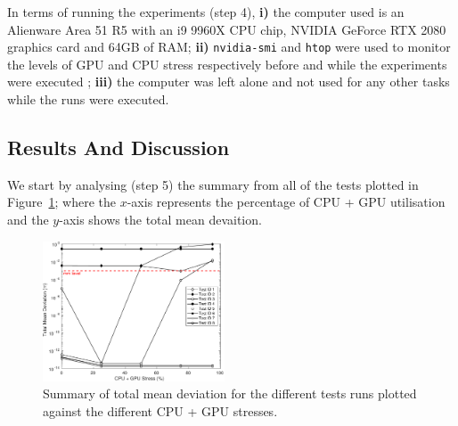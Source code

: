 In terms of running the experiments (step 4), \textbf{i)} the computer used is an Alienware Area 51 R5 with an i9 9960X CPU chip, NVIDIA GeForce RTX 2080 graphics card and 64GB of RAM; \textbf{ii)} \texttt{nvidia-smi} and \texttt{htop} were used to monitor the levels of GPU and CPU stress respectively before and while the experiments were executed \cite{monitoring_stresses}; \textbf{iii)} the computer was left alone and not used for any other tasks while the runs were executed.

\subsection{Results And Discussion}\label{ResultsSection}
We start by analysing (step 5) the summary from all of the tests plotted in Figure~\ref{ExperimentsStressSummary}; where the $x$-axis represents the percentage of CPU + GPU utilisation and the $y$-axis shows the total mean devaition. 
\begin{figure}[h]
    \centering
    \includegraphics[width=0.48\textwidth]{Other/Figures/ExperimentsStressSummary.pdf}
    \caption{Summary of total mean deviation for the different tests runs plotted against the different CPU + GPU stresses.}

    \label{ExperimentsStressSummary}
\end{figure}

